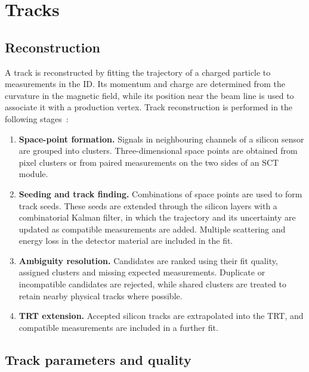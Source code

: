 \section{Tracks}
\label{sec:ch6_tracks}

\subsection{Reconstruction}

A track is reconstructed by fitting the trajectory of a charged particle to measurements in the ID.
Its momentum and charge are determined from the curvature in the magnetic field, while its position near the beam line is used to associate it with a production vertex.
Track reconstruction is performed in the following stages~\cite{ATLAS2017DenseTracking}:
\begin{enumerate}
    \item \textbf{Space-point formation.} Signals in neighbouring channels of a silicon sensor are grouped into clusters. Three-dimensional space points are obtained from pixel clusters or from paired measurements on the two sides of an SCT module.
    \item \textbf{Seeding and track finding.} Combinations of space points are used to form track seeds. These seeds are extended through the silicon layers with a combinatorial Kalman filter, in which the trajectory and its uncertainty are updated as compatible measurements are added. Multiple scattering and energy loss in the detector material are included in the fit.
    \item \textbf{Ambiguity resolution.} Candidates are ranked using their fit quality, assigned clusters and missing expected measurements. Duplicate or incompatible candidates are rejected, while shared clusters are treated to retain nearby physical tracks where possible.
    \item \textbf{TRT extension.} Accepted silicon tracks are extrapolated into the TRT, and compatible measurements are included in a further fit.
\end{enumerate}

\subsection{Track parameters and quality}


